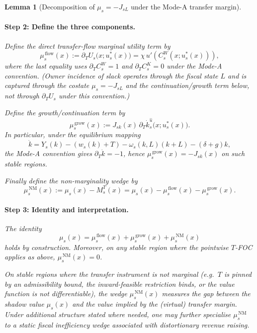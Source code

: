 \documentclass{article}
\newtheorem{lemma}{Lemma}
\begin{document}
\begin{lemma}[Decomposition of $\mu_s=-J_{sL}$ under the Mode-A transfer margin]
\paragraph{Step 2: Define the three components.}
Define the \emph{direct transfer-flow marginal utility term} by
\[
\mu_s^{\,\mathrm{flow}}(x)
:=
\partial_T U_s\big(x;u_s^*(x)\big)
=
\chi\,u'\!\left(C_s^W(x;u_s^*(x))\right),
\]
where the last equality uses $\partial_T C_s^W=1$ and $\partial_T C_s^K=0$ under the Mode-A convention.
(Owner incidence of slack operates through the fiscal state $L$ and is captured through the costate
$\mu_s=-J_{sL}$ and the continuation/growth term below, not through $\partial_T U_s$ under this convention.)

Define the \emph{growth/continuation term} by
\[
\mu_s^{\,\mathrm{grow}}(x)
:=
J_{sk}(x)\,\partial_T \dot k_s^{\hat u}\big(x;u_s^*(x)\big).
\]
In particular, under the equilibrium mapping
\[
\dot k = Y_s(k) - (w_s(k)+T) - \omega_s(k,L)(k+L) - (\delta+g)k,
\]
the Mode-A convention gives $\partial_T \dot k=-1$, hence $\mu_s^{\,\mathrm{grow}}(x)=-J_{sk}(x)$ on such
stable regions.

Finally define the \emph{non-marginality wedge} by
\[
\mu_s^{\,\mathrm{NM}}(x)
:=
\mu_s(x)-M_s^T(x)
=
\mu_s(x)-\mu_s^{\,\mathrm{flow}}(x)-\mu_s^{\,\mathrm{grow}}(x).
\]

\paragraph{Step 3: Identity and interpretation.}
The identity
\[
\mu_s(x)=\mu_s^{\,\mathrm{flow}}(x)+\mu_s^{\,\mathrm{grow}}(x)+\mu_s^{\,\mathrm{NM}}(x)
\]
holds by construction. Moreover, on any stable region where the pointwise $T$-FOC applies as above,
$\mu_s^{\,\mathrm{NM}}(x)=0$.

On stable regions where the transfer instrument is not marginal (e.g.\ $T$ is pinned by an admissibility
bound, the inward-feasible restriction binds, or the value function is not differentiable), the wedge
$\mu_s^{\,\mathrm{NM}}(x)$ measures the gap between the shadow value $\mu_s(x)$ and the value implied by the
(virtual) transfer margin. Under additional structure stated where needed, one may further specialise
$\mu_s^{\,\mathrm{NM}}$ to a static fiscal inefficiency wedge associated with distortionary revenue raising.
\end{lemma}


\end{document}

